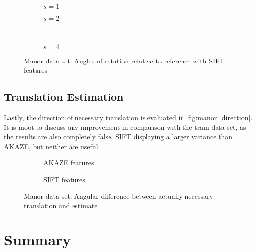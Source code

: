 \begin{figure}[h]
   \begin{subfigure}{.5\linewidth}
      \centering      
      
      \label{fig:manor_SIFT_rotation_1}
      \caption{$s=1$}
   \end{subfigure}
   \quad
   \begin{subfigure}{.5\linewidth}
      \centering      
      
      \label{fig:manor_SIFT_rotation_2}
      \caption{$s=2$}
   \end{subfigure}\\[3ex]
   \begin{subfigure}{\linewidth}
      \centering      
      
      \label{fig:manor_SIFT_rotation_4}
      \caption{$s=4$}
   \end{subfigure}
   \caption[Manor data: Rotation SIFT]{Manor data set: Angles of rotation relative to reference with
   SIFT features}
   \label{fig:manor_SIFT_rotation}
\end{figure}

\subsection{Translation Estimation}

Lastly, the direction of necessary translation is evaluated in
\autoref{fig:manor_direction}. It is moot to discuss any improvement in
comparison with the train data set, as the results are also completely false,
SIFT displaying a larger variance than AKAZE, but neither are useful.

\begin{figure}[h]
   \begin{subfigure}{.5\linewidth}
      \centering      
      
      \caption{AKAZE features}
      \label{fig:manor_KAZE_direction}
   \end{subfigure}
   \begin{subfigure}{.5\linewidth}
      \centering      
      
      \caption{SIFT features}
      \label{fig:manor_SIFT_direction}
   \end{subfigure}
   \caption[Manor data: Translation]{Manor data set: Angular difference between actually necessary translation and estimate}
   \label{fig:manor_direction}
\end{figure}

\section{Summary}

